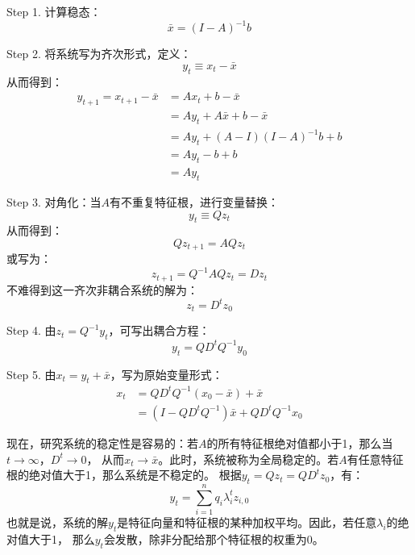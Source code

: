 Step 1. 计算稳态：
\begin{equation*}
    \bar{x} = \left(I-A\right)^{-1}b
\end{equation*}

Step 2. 将系统写为齐次形式，定义：
\begin{equation*}
    y_t \equiv x_t - \bar{x}
\end{equation*}
从而得到：
\begin{equation*}
    \begin{aligned}
        y_{t+1}=x_{t+1}-\bar{x} & =A x_t+b-\bar{x} \\
        & =A y_t+A \bar{x}+b-\bar{x} \\
        & =A y_t+(A-I)(I-A)^{-1} b+b \\
        & =A y_t-b+b \\
        & =A y_t
    \end{aligned}
\end{equation*}

Step 3. 对角化：当$A$有不重复特征根，进行变量替换：
\begin{equation*}
    y_t \equiv Qz_t
\end{equation*}
从而得到：
\begin{equation*}
    Qz_{t+1} = AQz_t
\end{equation*}
或写为：
\begin{equation*}
    z_{t+1} = Q^{-1}AQz_t = Dz_t
\end{equation*}
不难得到这一齐次非耦合系统的解为：
\begin{equation*}
    z_t = D^t z_0
\end{equation*}

Step 4. 由$z_t = Q^{-1}y_t$，可写出耦合方程：
\begin{equation*}
    y_t = QD^tQ^{-1}y_0
\end{equation*}

Step 5. 由$x_t=y_t + \bar{x}$，写为原始变量形式：
\begin{equation*}
    \begin{aligned}
        x_t & =Q D^t Q^{-1}\left(x_0-\bar{x}\right)+\bar{x} \\
        & =\left(I-Q D^t Q^{-1}\right) \bar{x}+Q D^t Q^{-1} x_0
    \end{aligned}
\end{equation*}

现在，研究系统的稳定性是容易的：若$A$的所有特征根绝对值都小于1，那么当$t\rightarrow \infty$，$D^t\rightarrow 0$，
从而$x_t\rightarrow \bar{x}$。此时，系统被称为全局稳定的。若$A$有任意特征根的绝对值大于1，那么系统是不稳定的。
根据$y_t = Qz_t=QD^tz_0$，有：
\begin{equation*}
    y_t = \sum_{i=1}^{n}q_i\lambda_i^tz_{i,0}
\end{equation*}
也就是说，系统的解$y_t$是特征向量和特征根的某种加权平均。因此，若任意$\lambda_i$的绝对值大于1，
那么$y_t$会发散，除非分配给那个特征根的权重为0。


